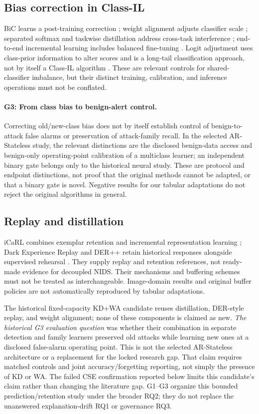 \documentclass[10pt,twocolumn]{article}
\begin{document}
\subsection{Bias correction in Class-IL}
BiC learns a post-training correction \citep{bic}; weight alignment adjusts classifier scale \citep{wa}; separated softmax and taskwise distillation address cross-task interference \citep{ssil}; end-to-end incremental learning includes balanced fine-tuning \citep{eeil}. Logit adjustment uses class-prior information to alter scores and is a long-tail classification approach, not by itself a Class-IL algorithm \citep{menon}. These are relevant controls for shared-classifier imbalance, but their distinct training, calibration, and inference operations must not be conflated.

\paragraph{G3: From class bias to benign-alert control.}
Correcting old/new-class bias does not by itself establish control of benign-to-attack false alarms or preservation of attack-family recall. In the selected AR-Stateless study, the relevant distinctions are the disclosed benign-data access and benign-only operating-point calibration of a multiclass learner; an independent binary gate belongs only to the historical neural study. These are protocol and endpoint distinctions, not proof that the original methods cannot be adapted, or that a binary gate is novel. Negative results for our tabular adaptations do not reject the original algorithms in general.

\subsection{Replay and distillation}
iCaRL combines exemplar retention and incremental representation learning \citep{icarl}; Dark Experience Replay and DER++ retain historical responses alongside supervised rehearsal \citep{der}. They supply replay and retention references, not ready-made evidence for decoupled NIDS. Their mechanisms and buffering schemes must not be treated as interchangeable. Image-domain results and original buffer policies are not automatically reproduced by tabular adaptations.

The historical fixed-capacity KD+WA candidate reuses distillation, DER-style replay, and weight alignment; none of these components is claimed as new. \emph{The historical G3 evaluation question} was whether their combination in separate detection and family learners preserved old attacks while learning new ones at a disclosed false-alarm operating point. This is not the selected AR-Stateless architecture or a replacement for the locked research gap. That claim requires matched controls and joint accuracy/forgetting reporting, not simply the presence of KD or WA. The failed CSE confirmation reported below limits this candidate's claim rather than changing the literature gap. G1--G3 organize this bounded prediction/retention study under the broader RQ2; they do not replace the unanswered explanation-drift RQ1 or governance RQ3.
\end{document}
